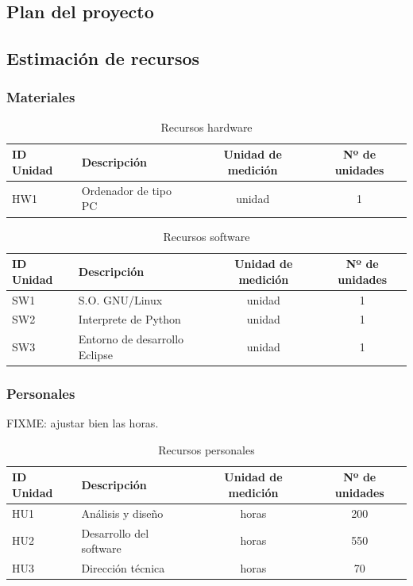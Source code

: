 
\subsection{Plan del proyecto}

\subsection{Estimación de recursos}

\subsubsection{Materiales}

\begin{table}[H]
 \begin{center}
  \begin{tabular}{|l|l|c|c|}
	\hline
	\textbf{ID Unidad} & \textbf{Descripción} & \textbf{Unidad de medición} & \textbf{Nº de unidades} \\
	\hline
	HW1 & Ordenador de tipo PC & unidad & 1 \\
	\hline
  \end{tabular}
  \caption{Recursos hardware}
 \end{center}
\end{table}

\begin{table}[H]
 \begin{center}
  \begin{tabular}{|l|l|c|c|}
	\hline
	\textbf{ID Unidad} & \textbf{Descripción} & \textbf{Unidad de medición} & \textbf{Nº de unidades} \\
	\hline
	SW1 & S.O. GNU/Linux & unidad & 1 \\
	\hline
	SW2 & Interprete de Python & unidad & 1 \\
	\hline
	SW3 & Entorno de desarrollo Eclipse & unidad & 1 \\
	\hline
  \end{tabular}
  \caption{Recursos software}
 \end{center}
\end{table}

\subsubsection{Personales}

FIXME: ajustar bien las horas.

\begin{table}[H]
 \begin{center}
  \begin{tabular}{|l|l|c|c|}
	\hline
	\textbf{ID Unidad} & \textbf{Descripción} & \textbf{Unidad de medición} & \textbf{Nº de unidades} \\
	\hline
	HU1 & Análisis y diseño & horas & 200 \\
	\hline
	HU2 & Desarrollo del software & horas & 550 \\
	\hline
	HU3 & Dirección técnica & horas & 70 \\
	\hline
  \end{tabular}
  \caption{Recursos personales}
 \end{center}
\end{table}

